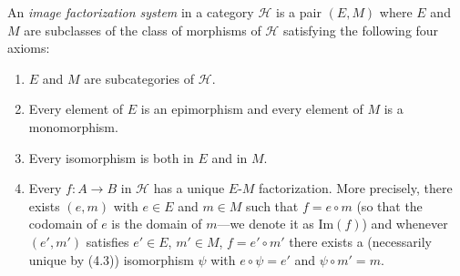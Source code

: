 An \textit{image factorization system} in a category $\mathcal{H}$ is a pair $(E, M)$ where $E$ and $M$ are subclasses of the class of morphisms of $\mathcal{H}$ satisfying the following four axioms:

\begin{enumerate}
\item[(4.2)] $E$ and $M$ are subcategories of $\mathcal{H}$.
\item[(4.3)] Every element of $E$ is an epimorphism and every element of $M$ is a monomorphism.
\item[(4.4)] Every isomorphism is both in $E$ and in $M$.
\item[(4.5)] Every $f: A \longrightarrow B$ in $\mathcal{H}$ has a unique $E$-$M$ factorization. More precisely, there exists $(e, m)$ with $e \in E$ and $m \in M$ such that $f = e \circ m$ (so that the codomain of $e$ is the domain of $m$—we denote it as $\mathrm{Im}(f)$) and whenever $(e', m')$ satisfies $e' \in E$, $m' \in M$, $f = e' \circ m'$ there exists a (necessarily unique by (4.3)) isomorphism $\psi$ with $e \circ \psi = e'$ and $\psi \circ m' = m$.
\end{enumerate}
